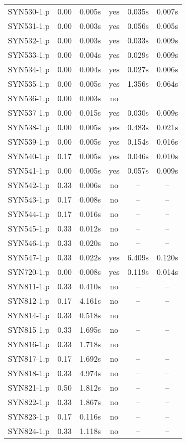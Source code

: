 \begin{longtable}{||c | c | c | c | c | c||}
SYN530-1.p & 0.00 & 0.005s & yes & 0.035s & 0.007s \\
SYN531-1.p & 0.00 & 0.003s & yes & 0.056s & 0.005s \\
SYN532-1.p & 0.00 & 0.003s & yes & 0.033s & 0.009s \\
SYN533-1.p & 0.00 & 0.004s & yes & 0.029s & 0.009s \\
SYN534-1.p & 0.00 & 0.004s & yes & 0.027s & 0.006s \\
SYN535-1.p & 0.00 & 0.005s & yes & 1.356s & 0.064s \\
SYN536-1.p & 0.00 & 0.003s & no & -- & -- \\
SYN537-1.p & 0.00 & 0.015s & yes & 0.030s & 0.009s \\
SYN538-1.p & 0.00 & 0.005s & yes & 0.483s & 0.021s \\
SYN539-1.p & 0.00 & 0.005s & yes & 0.154s & 0.016s \\
SYN540-1.p & 0.17 & 0.005s & yes & 0.046s & 0.010s \\
SYN541-1.p & 0.00 & 0.005s & yes & 0.057s & 0.009s \\
SYN542-1.p & 0.33 & 0.006s & no & -- & -- \\
SYN543-1.p & 0.17 & 0.008s & no & -- & -- \\
SYN544-1.p & 0.17 & 0.016s & no & -- & -- \\
SYN545-1.p & 0.33 & 0.012s & no & -- & -- \\
SYN546-1.p & 0.33 & 0.020s & no & -- & -- \\
SYN547-1.p & 0.33 & 0.022s & yes & 6.409s & 0.120s \\
SYN720-1.p & 0.00 & 0.008s & yes & 0.119s & 0.014s \\
SYN811-1.p & 0.33 & 0.410s & no & -- & -- \\
SYN812-1.p & 0.17 & 4.161s & no & -- & -- \\
SYN814-1.p & 0.33 & 0.518s & no & -- & -- \\
SYN815-1.p & 0.33 & 1.695s & no & -- & -- \\
SYN816-1.p & 0.33 & 1.718s & no & -- & -- \\
SYN817-1.p & 0.17 & 1.692s & no & -- & -- \\
SYN818-1.p & 0.33 & 4.974s & no & -- & -- \\	
SYN821-1.p & 0.50 & 1.812s & no & -- & -- \\
SYN822-1.p & 0.33 & 1.867s & no & -- & -- \\
SYN823-1.p & 0.17 & 0.116s & no & -- & -- \\
SYN824-1.p & 0.33 & 1.118s & no & -- & -- \\

\end{longtable}
